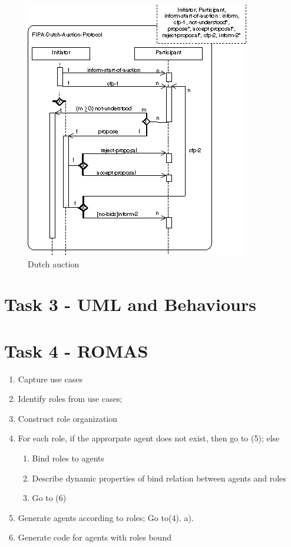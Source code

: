 \documentclass[a4paper, 11pt]{article}
\begin{document}
\begin{figure}[H]
	\caption{Dutch auction}
	\centering
	\includegraphics[scale=0.9]{./images/sequence-dutchauction.png}
\end{figure}

\section{Task 3 - UML and Behaviours}

\section{Task 4 - ROMAS}
\begin{enumerate}
\item Capture use cases
\item Identify roles from use cases;
\item Construct role organization
\item For each role, if the approrpate agent does not exist, then go to (5); else
\begin{enumerate}
\item Bind roles to agents
\item Describe dynamic properties of bind relation between agents and roles
\item Go to (6)
\end{enumerate}
\item Generate agents according to roles; Go to(4). a).
\item Generate code for agents with roles bound
\end{enumerate}
\end{document}
